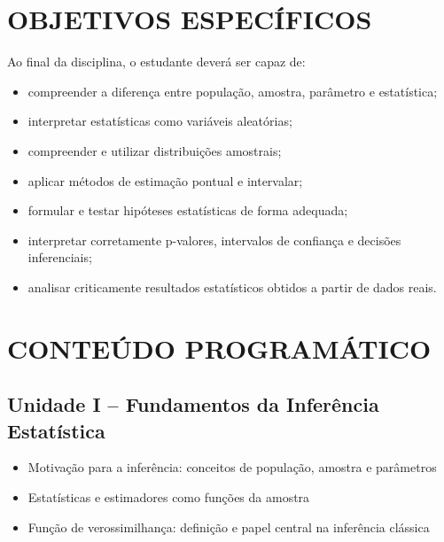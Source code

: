 \documentclass[
  letterpaper,
  DIV=11,
  numbers=noendperiod]{scrreprt}
\begin{document}
\section*{OBJETIVOS ESPECÍFICOS}\label{objetivos-especuxedficos}


Ao final da disciplina, o estudante deverá ser capaz de:

\begin{itemize}
\item
  compreender a diferença entre população, amostra, parâmetro e
  estatística;
\item
  interpretar estatísticas como variáveis aleatórias;
\item
  compreender e utilizar distribuições amostrais;
\item
  aplicar métodos de estimação pontual e intervalar;
\item
  formular e testar hipóteses estatísticas de forma adequada;
\item
  interpretar corretamente p-valores, intervalos de confiança e decisões
  inferenciais;
\item
  analisar criticamente resultados estatísticos obtidos a partir de
  dados reais.
\end{itemize}

\section*{CONTEÚDO PROGRAMÁTICO}\label{conteuxfado-programuxe1tico}


\subsection*{Unidade I -- Fundamentos da Inferência
Estatística}\label{unidade-i-fundamentos-da-inferuxeancia-estatuxedstica}

\begin{itemize}
\item
  Motivação para a inferência: conceitos de população, amostra e
  parâmetros
\item
  Estatísticas e estimadores como funções da amostra
\item
  Função de verossimilhança: definição e papel central na inferência
  clássica
\end{itemize}
\end{document}
